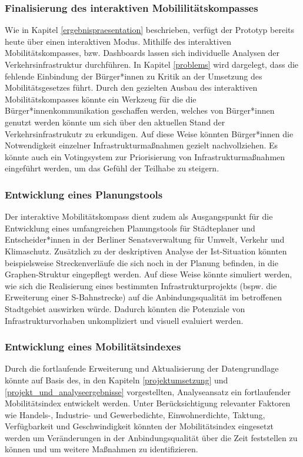 \subsubsection{Finalisierung des interaktiven Mobililitätskompasses}
Wie in Kapitel \ref{ergebnispraesentation} beschrieben, verfügt der Prototyp bereits heute über einen interaktiven Modus. Mithilfe des interaktiven Mobilitätskompasses, bzw. Dashboards lassen sich individuelle Analysen der Verkehrsinfrastruktur durchführen. In Kapitel \ref{problems} wird dargelegt, dass die fehlende Einbindung der Bürger*innen zu Kritik an der Umsetzung des Mobilitätsgesetzes führt. Durch den gezielten Ausbau des interaktiven Mobilitätskompasses könnte ein Werkzeug für die die Bürger*innenkommunikation geschaffen werden, welches von Bürger*innen genutzt werden könnte um sich über den aktuellen Stand der Verkehrsinfrastrukutr zu erkundigen. Auf diese Weise könnten Bürger*innen die Notwendigkeit einzelner Infrastrukturmaßnahmen gezielt nachvollziehen. Es könnte auch ein Votingsystem zur Priorisierung von Infrastrukturmaßnahmen eingeführt werden, um das Gefühl der Teilhabe zu steigern.



\subsubsection{Entwicklung eines Planungstools}
Der interaktive Mobilitätskompass dient zudem als Ausgangspunkt für die Entwicklung eines umfangreichen Planungstools für Städteplaner und Entscheider*innen in der Berliner Senatsverwaltung für Umwelt, Verkehr und Klimaschutz. Zusätzlich zu der deskriptiven Analyse der Ist-Situation könnten beispielsweise Streckenverläufe die sich noch in der Planung befinden, in die Graphen-Struktur eingepflegt werden. Auf diese Weise könnte simuliert werden, wie sich die Realisierung eines bestimmten Infrastrukturprojekts (bspw. die Erweiterung einer S-Bahnstrecke) auf die Anbindungsqualität im betroffenen Stadtgebiet auswirken würde. Dadurch könnten die Potenziale von Infrastrukturvorhaben unkompliziert und visuell evaluiert werden.

\subsubsection{Entwicklung eines Mobilitätsindexes}\label{mobwob_index}
Durch die fortlaufende Erweiterung und Aktualisierung der Datengrundlage könnte auf Basis des, in den Kapiteln \ref{projektumsetzung} und \ref{projekt_und_analyseergebnisse} vorgestellten, Analyseansatz ein fortlaufender Mobilitätsindex entwickelt werden. Unter Berücksichtigung relevanter Faktoren wie Handels-, Industrie- und Gewerbedichte, Einwohnerdichte, Taktung, Verfügbarkeit und Geschwindigkeit könnten der Mobilitätsindex eingesetzt werden um Veränderungen in der Anbindungsqualität über die Zeit feststellen zu können und um weitere Maßnahmen zu identifizieren. 

